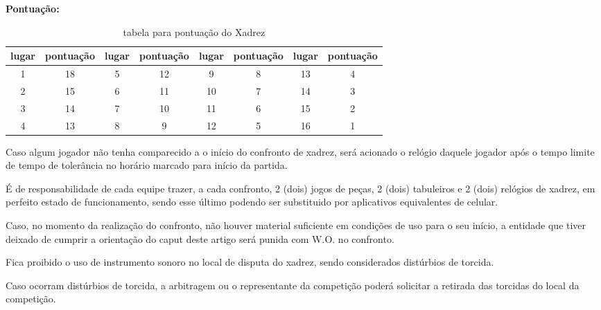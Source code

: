 \textbf{Pontuação:}
\begin{table}[h]
\centering
\begin{tabular}{|c|c|c|c|c|c|c|c|}
\hline
lugar & pontuação & lugar & pontuação & lugar & pontuação & lugar & pontuação \\ \hline
1     & 18        & 5     & 12         & 9     & 8         & 13    & 4         \\ \hline
2     & 15        & 6     & 11         & 10    & 7         & 14    & 3         \\ \hline
3     & 14        & 7     & 10         & 11    & 6         & 15    & 2         \\ \hline
4     & 13        & 8     & 9         & 12    & 5         & 16    & 1         \\ \hline
\end{tabular}
\caption{tabela para pontuação do Xadrez}
\end{table}

\begin{article}
	Caso algum jogador não tenha comparecido a o início do confronto de xadrez, será acionado o relógio daquele jogador após o tempo limite de tempo de tolerância no horário marcado para início da partida.
\end{article}


\begin{article}
	É de responsabilidade de cada equipe trazer, a cada confronto, 2 (dois) jogos de peças, 2 (dois) tabuleiros e 2 (dois) relógios de xadrez, em perfeito estado de funcionamento, sendo esse último podendo ser substituido por aplicativos equivalentes de celular.

	\begin{xparagraph}
		Caso, no momento da realização do confronto, não houver material suficiente em condições de uso para o seu início, a entidade que tiver deixado de cumprir a orientação do caput deste artigo será punida com W.O. no confronto.
	\end{xparagraph}
\end{article}

\begin{article}
	Fica proibido o uso de instrumento sonoro no local de disputa do xadrez, sendo considerados distúrbios de torcida.

	\begin{xparagraph}
		Caso ocorram distúrbios de torcida, a arbitragem ou o representante da competição poderá solicitar a retirada das torcidas do local da competição.
	\end{xparagraph}
\end{article}

